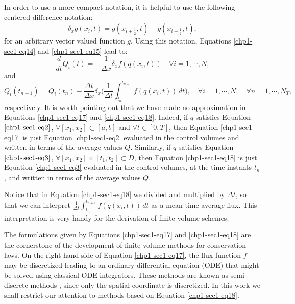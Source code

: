 In order to use a more compact notation, it is helpful to use the following centered difference notation:
\begin{equation}
	\label{chp1-sec1-eq16}
	\delta_x {g}(x_i,t) = 
	{g}(x_{i+\frac{1}{2}},t) - 
	{g}(x_{i-\frac{1}{2}},t),
\end{equation}
for an arbitrary vector valued function ${g}$. 
Using this notation, Equations \eqref{chp1-sec1-eq14}
and \eqref{chp1-sec1-eq15} lead to:
\begin{equation}
        \label{chp1-sec1-eq17}
        \frac{d}{dt} {Q}_i(t) = -\frac{1}{\Delta x}
	\delta_x {f}({q}(x_{i},t))
        \quad \forall i = 1, \cdots, N,
\end{equation}
and
\begin{equation}
        \label{chp1-sec1-eq18}
        {Q}_i(t_{n+1}) =  {Q}_i(t_n) -
	\frac{\Delta t}{  \Delta x} \delta _x\bigg( \frac{1}{\Delta t}\int_{t_n}^{t_{n+1}}
        {f}({q}(x_{i}, t)) \,dt \bigg),
        \quad \forall i = 1, \cdots, N,
        \quad \forall n = 1, \cdots, N_T,
\end{equation}
respectively.
It is worth pointing out that we have made no approximation in Equations
\eqref{chp1-sec1-eq17} and \eqref{chp1-sec1-eq18}. Indeed, if ${q}$ satisfies Equation
$\eqref{chp1-sec1-eq2}$, $\forall [x_1, x_2] \subset [a,b]$ and $\forall t \in [0,T]$,
then Equation \eqref{chp1-sec1-eq17} is just Equation
\eqref{chp1-sec1-eq2} evaluated in the control volumes and written
in terms of the average values ${Q}$. 
Similarly, if ${q}$ satisfies Equation
$\eqref{chp1-sec1-eq3}$, $\forall [x_1, x_2] \times [t_1, t_2] \subset D$,
then Equation \eqref{chp1-sec1-eq18} is just Equation
\eqref{chp1-sec1-eq3} evaluated in the control volumes,
at the time instants $t_n$, and written
in terms of the average values ${Q}$.

Notice that in Equation \eqref{chp1-sec1-eq18} we divided and multiplied by $\Delta t$, so that 
we can interpret $\frac{1}{\Delta t}\int_{t_n}^{t_{n+1}}
{f}({q}(x_{i}, t)) \,dt $ as a mean-time average flux.
This interpretation is very handy for the derivation of finite-volume schemes.

The formulations given by Equations \eqref{chp1-sec1-eq17} and \eqref{chp1-sec1-eq18} are the cornerstone 
of the development of finite volume methods for conservation laws. 
On the right-hand side of Equation \eqref{chp1-sec1-eq17}, the flux function ${f}$ 
may be discretized leading to an ordinary differential equation (ODE)
that might be solved using classical ODE integrators. 
These methods are known as semi-discrete methods \citep{leveque:2002}, since only the spatial coordinate is discretized.
In this work we shall restrict our attention to methods based on Equation \eqref{chp1-sec1-eq18}.

